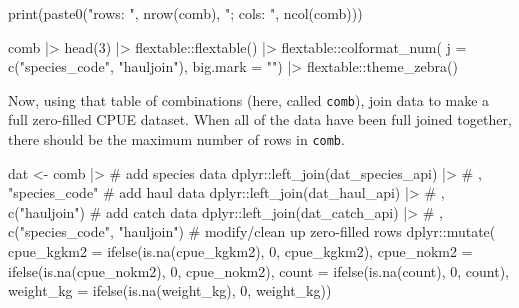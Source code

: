 \documentclass[
  letterpaper,
  oneside,
  open=any]{scrbook}
\newenvironment{Shaded}{\begin{snugshade}}{\end{snugshade}}
\newcommand{\AttributeTok}[1]{\textcolor[rgb]{0.40,0.45,0.13}{#1}}
\newcommand{\CommentTok}[1]{\textcolor[rgb]{0.37,0.37,0.37}{#1}}
\newcommand{\DecValTok}[1]{\textcolor[rgb]{0.68,0.00,0.00}{#1}}
\newcommand{\FunctionTok}[1]{\textcolor[rgb]{0.28,0.35,0.67}{#1}}
\newcommand{\NormalTok}[1]{\textcolor[rgb]{0.00,0.23,0.31}{#1}}
\newcommand{\OtherTok}[1]{\textcolor[rgb]{0.00,0.23,0.31}{#1}}
\newcommand{\SpecialCharTok}[1]{\textcolor[rgb]{0.37,0.37,0.37}{#1}}
\newcommand{\StringTok}[1]{\textcolor[rgb]{0.13,0.47,0.30}{#1}}
\begin{document}
\begin{Shaded}
\begin{Highlighting}[]
\FunctionTok{print}\NormalTok{(}\FunctionTok{paste0}\NormalTok{(}\StringTok{"rows: "}\NormalTok{, }\FunctionTok{nrow}\NormalTok{(comb), }\StringTok{"; cols: "}\NormalTok{, }\FunctionTok{ncol}\NormalTok{(comb)))}

\NormalTok{comb }\SpecialCharTok{|\textgreater{}} \FunctionTok{head}\NormalTok{(}\DecValTok{3}\NormalTok{) }\SpecialCharTok{|\textgreater{}} 
\NormalTok{  flextable}\SpecialCharTok{::}\FunctionTok{flextable}\NormalTok{()  }\SpecialCharTok{|\textgreater{}}
\NormalTok{  flextable}\SpecialCharTok{::}\FunctionTok{colformat\_num}\NormalTok{(}
      \AttributeTok{j =} \FunctionTok{c}\NormalTok{(}\StringTok{"species\_code"}\NormalTok{, }\StringTok{"hauljoin"}\NormalTok{), }
      \AttributeTok{big.mark =} \StringTok{""}\NormalTok{) }\SpecialCharTok{|\textgreater{}} 
\NormalTok{  flextable}\SpecialCharTok{::}\FunctionTok{theme\_zebra}\NormalTok{()}
\end{Highlighting}
\end{Shaded}

Now, using that table of combinations (here, called \texttt{comb}), join
data to make a full zero-filled CPUE dataset. When all of the data have
been full joined together, there should be the maximum number of rows in
\texttt{comb}.

\begin{Shaded}
\begin{Highlighting}[]
\NormalTok{dat }\OtherTok{\textless{}{-}}\NormalTok{ comb }\SpecialCharTok{|\textgreater{}}
  \CommentTok{\# add species data}
\NormalTok{  dplyr}\SpecialCharTok{::}\FunctionTok{left\_join}\NormalTok{(dat\_species\_api) }\SpecialCharTok{|\textgreater{}} \CommentTok{\# , "species\_code"}
  \CommentTok{\# add haul data}
\NormalTok{  dplyr}\SpecialCharTok{::}\FunctionTok{left\_join}\NormalTok{(dat\_haul\_api) }\SpecialCharTok{|\textgreater{}} \CommentTok{\# , c("hauljoin")}
  \CommentTok{\# add catch data}
\NormalTok{  dplyr}\SpecialCharTok{::}\FunctionTok{left\_join}\NormalTok{(dat\_catch\_api) }\SpecialCharTok{|\textgreater{}} \CommentTok{\# , c("species\_code", "hauljoin")}
  \CommentTok{\# modify/clean up zero{-}filled rows}
\NormalTok{  dplyr}\SpecialCharTok{::}\FunctionTok{mutate}\NormalTok{(}
    \AttributeTok{cpue\_kgkm2 =} \FunctionTok{ifelse}\NormalTok{(}\FunctionTok{is.na}\NormalTok{(cpue\_kgkm2), }\DecValTok{0}\NormalTok{, cpue\_kgkm2),}
    \AttributeTok{cpue\_nokm2 =} \FunctionTok{ifelse}\NormalTok{(}\FunctionTok{is.na}\NormalTok{(cpue\_nokm2), }\DecValTok{0}\NormalTok{, cpue\_nokm2),}
    \AttributeTok{count =} \FunctionTok{ifelse}\NormalTok{(}\FunctionTok{is.na}\NormalTok{(count), }\DecValTok{0}\NormalTok{, count),}
    \AttributeTok{weight\_kg =} \FunctionTok{ifelse}\NormalTok{(}\FunctionTok{is.na}\NormalTok{(weight\_kg), }\DecValTok{0}\NormalTok{, weight\_kg))}
\end{Highlighting}
\end{Shaded}
\end{document}
